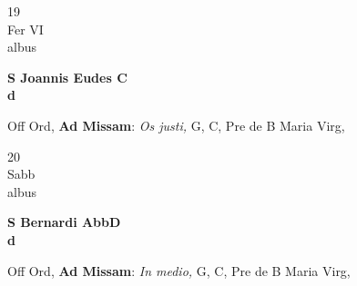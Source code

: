 \documentclass[10pt, openany]{book}
\begin{document}
        \begin{center}
            \begin{minipage}{3.5in}
                \vspace{2em}
                \begin{minipage}{0.5in}
                    {\Huge 19} \\
                    {\normalsize Fer VI} \\
                    {\normalsize albus}
                \end{minipage}
                \begin{minipage}{3.0in}
                    \textbf{ \large S Joannis Eudes C \\
                    \textnormal{\normalsize d}} \\ 
                \end{minipage}
                \begin{justify}Off Ord, \textbf{Ad Missam}: \textit{Os justi,} G, C, Pre de B Maria Virg,   
                \end{justify}
            \end{minipage}
        \end{center}
    
        \begin{center}
            \begin{minipage}{3.5in}
                \vspace{2em}
                \begin{minipage}{0.5in}
                    {\Huge 20} \\
                    {\normalsize Sabb} \\
                    {\normalsize albus}
                \end{minipage}
                \begin{minipage}{3.0in}
                    \textbf{ \large S Bernardi AbbD \\
                    \textnormal{\normalsize d}} \\ 
                \end{minipage}
                \begin{justify}Off Ord, \textbf{Ad Missam}: \textit{In medio,} G, C, Pre de B Maria Virg,   
                \end{justify}
            \end{minipage}
        \end{center}
    
\end{document}
